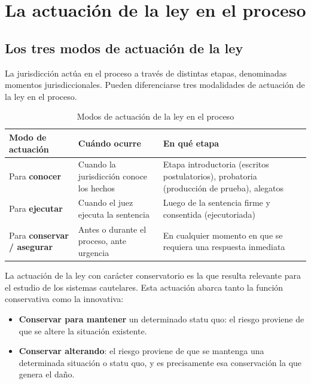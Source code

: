 \documentclass[12pt,oneside]{book}
\begin{document}
\section{La actuación de la ley en el proceso}

\subsection{Los tres modos de actuación de la ley}

La jurisdicción actúa en el proceso a través de distintas etapas, denominadas momentos jurisdiccionales. Pueden diferenciarse tres modalidades de actuación de la ley en el proceso.

\begin{table}[H]
\centering
\begin{tabularx}{\textwidth}{
    >{\raggedright\arraybackslash}p{}
    >{\raggedright\arraybackslash}X
    >{\raggedright\arraybackslash}X
}
\toprule
\textbf{Modo de actuación} & \textbf{Cuándo ocurre} & \textbf{En qué etapa} \\
\midrule
Para \textbf{conocer} & Cuando la jurisdicción conoce los hechos & Etapa introductoria (escritos postulatorios), probatoria (producción de prueba), alegatos \\
Para \textbf{ejecutar} & Cuando el juez ejecuta la sentencia & Luego de la sentencia firme y consentida (ejecutoriada) \\
Para \textbf{conservar / asegurar} & Antes o durante el proceso, ante urgencia & En cualquier momento en que se requiera una respuesta inmediata \\
\bottomrule
\end{tabularx}
\caption{Modos de actuación de la ley en el proceso}
\end{table}

La actuación de la ley con carácter conservatorio es la que resulta relevante para el estudio de los sistemas cautelares. Esta actuación abarca tanto la función conservativa como la innovativa:

\begin{itemize}
    \item \textbf{Conservar para mantener} un determinado statu quo: el riesgo proviene de que se altere la situación existente.
    \item \textbf{Conservar alterando}: el riesgo proviene de que se mantenga una determinada situación o statu quo, y es precisamente esa conservación la que genera el daño.
\end{itemize}
\end{document}
